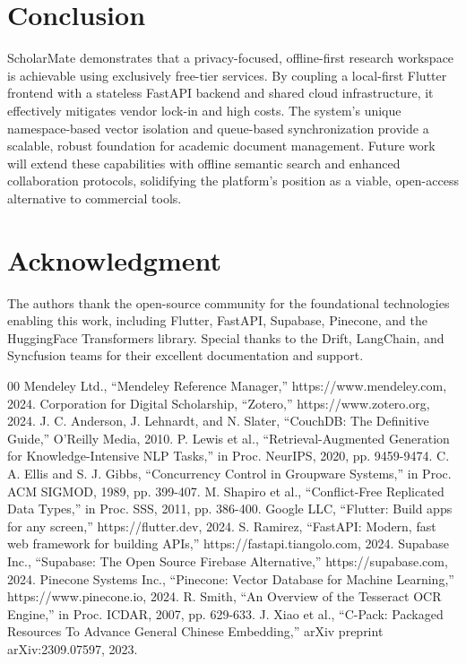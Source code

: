 \documentclass[conference]{IEEEtran}
\begin{document}
\section{Conclusion}

ScholarMate demonstrates that a privacy-focused, offline-first research workspace is achievable using exclusively free-tier services. By coupling a local-first Flutter frontend with a stateless FastAPI backend and shared cloud infrastructure, it effectively mitigates vendor lock-in and high costs. The system's unique namespace-based vector isolation and queue-based synchronization provide a scalable, robust foundation for academic document management. Future work will extend these capabilities with offline semantic search and enhanced collaboration protocols, solidifying the platform's position as a viable, open-access alternative to commercial tools.

\section*{Acknowledgment}

The authors thank the open-source community for the foundational technologies enabling this work, including Flutter, FastAPI, Supabase, Pinecone, and the HuggingFace Transformers library. Special thanks to the Drift, LangChain, and Syncfusion teams for their excellent documentation and support.

\begin{thebibliography}{00}
 Mendeley Ltd., ``Mendeley Reference Manager,'' https://www.mendeley.com, 2024.
 Corporation for Digital Scholarship, ``Zotero,'' https://www.zotero.org, 2024.
 J. C. Anderson, J. Lehnardt, and N. Slater, ``CouchDB: The Definitive Guide,'' O'Reilly Media, 2010.
 P. Lewis et al., ``Retrieval-Augmented Generation for Knowledge-Intensive NLP Tasks,'' in Proc. NeurIPS, 2020, pp. 9459-9474.
 C. A. Ellis and S. J. Gibbs, ``Concurrency Control in Groupware Systems,'' in Proc. ACM SIGMOD, 1989, pp. 399-407.
 M. Shapiro et al., ``Conflict-Free Replicated Data Types,'' in Proc. SSS, 2011, pp. 386-400.
 Google LLC, ``Flutter: Build apps for any screen,'' https://flutter.dev, 2024.
 S. Ramirez, ``FastAPI: Modern, fast web framework for building APIs,'' https://fastapi.tiangolo.com, 2024.
 Supabase Inc., ``Supabase: The Open Source Firebase Alternative,'' https://supabase.com, 2024.
 Pinecone Systems Inc., ``Pinecone: Vector Database for Machine Learning,'' https://www.pinecone.io, 2024.
 R. Smith, ``An Overview of the Tesseract OCR Engine,'' in Proc. ICDAR, 2007, pp. 629-633.
 J. Xiao et al., ``C-Pack: Packaged Resources To Advance General Chinese Embedding,'' arXiv preprint arXiv:2309.07597, 2023.
\end{thebibliography}
\end{document}
